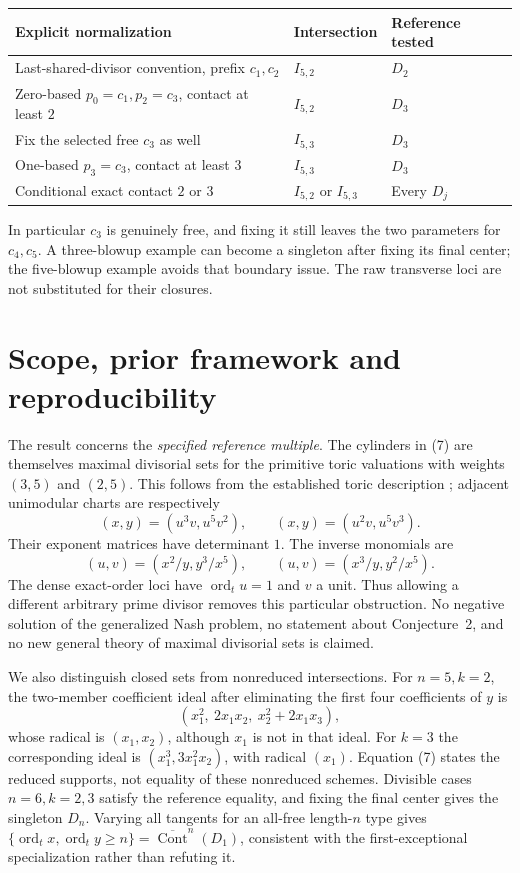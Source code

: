 \documentclass[11pt]{article}
\newcommand{\ord}{\operatorname{ord}_t}
\newcommand{\Cont}{\overline{\operatorname{Cont}}}
\begin{document}
\begin{center}
\small
\begin{tabular}{p{}
                p{}
                p{}}
Explicit normalization & Intersection & Reference tested\\ \hline
Last-shared-divisor convention, prefix \(c_1,c_2\)
 & \(I_{5,2}\) & \(D_2\)\\
Zero-based \(p_0=c_1,p_2=c_3\), contact at least \(2\)
 & \(I_{5,2}\) & \(D_3\)\\
Fix the selected free \(c_3\) as well
 & \(I_{5,3}\) & \(D_3\)\\
One-based \(p_3=c_3\), contact at least \(3\)
 & \(I_{5,3}\) & \(D_3\)\\
Conditional exact contact \(2\) or \(3\)
 & \(I_{5,2}\) or \(I_{5,3}\) & Every \(D_j\)
\end{tabular}
\end{center}
In particular \(c_3\) is genuinely free, and fixing it still leaves the
two parameters for \(c_4,c_5\). A three-blowup example can become a
singleton after fixing its final center; the five-blowup example avoids
that boundary issue. The raw transverse loci are not substituted for
their closures.

\section{Scope, prior framework and reproducibility}

The result concerns the \emph{specified reference multiple}. The
cylinders in (7) are themselves maximal divisorial sets for the primitive
toric valuations with weights \((3,5)\) and \((2,5)\). This follows from
the established toric description \cite[Example~2.10]{ishii}; adjacent
unimodular charts are respectively
\[
 (x,y)=(u^3v,u^5v^2),\qquad (x,y)=(u^2v,u^5v^3).
\]
Their exponent matrices have determinant \(1\). The inverse monomials are
\[
 (u,v)=(x^2/y,y^3/x^5),\qquad (u,v)=(x^3/y,y^2/x^5).
\]
The dense exact-order loci have \(\ord u=1\) and \(v\) a unit.
Thus allowing a different arbitrary prime divisor removes this
particular obstruction. No negative solution of the generalized Nash
problem, no statement about Conjecture~2, and no new general theory of
maximal divisorial sets is claimed.

We also distinguish closed sets from nonreduced intersections. For
\(n=5,k=2\), the two-member coefficient ideal after eliminating the first
four coefficients of \(y\) is
\[
 (x_1^2,\ 2x_1x_2,\ x_2^2+2x_1x_3),
\]
whose radical is \((x_1,x_2)\), although \(x_1\) is not in that ideal.
For \(k=3\) the corresponding ideal is
\((x_1^3,3x_1^2x_2)\), with radical \((x_1)\).
Equation (7) states the reduced supports, not equality of these
nonreduced schemes. Divisible cases \(n=6,k=2,3\) satisfy the reference
equality, and fixing the final center gives the singleton \(D_n\).
Varying all tangents for an all-free length-\(n\) type gives
\(\{\ord x,\ord y\geq n\}=\Cont^n(D_1)\), consistent with the
first-exceptional specialization rather than refuting it.
\end{document}
